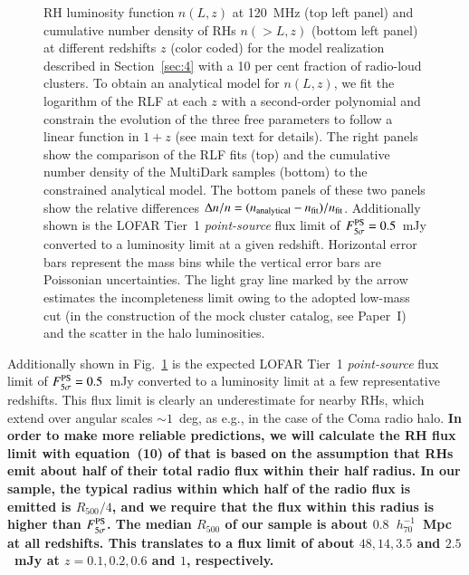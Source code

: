 \documentclass[useAMS,usenatbib]{mn2e}
\begin{document}
\begin{figure}
\caption{RH luminosity function $n(L,z)$ at 120~MHz (top left panel) and cumulative
  number density of RHs  $n(>L,z)$ (bottom left panel) at different redshifts $z$ (color
  coded) for the model realization described in Section~\ref{sec:4} with a 10 per cent
  fraction of radio-loud clusters. To obtain an analytical model for $n(L,z)$,
  we fit the logarithm of the RLF at each $z$ with a second-order polynomial and
  constrain the evolution of the three free parameters to follow a linear
  function in $1+z$ (see main text for details). The right panels show the
  comparison of the RLF fits (top) and the cumulative number density of the
  MultiDark samples (bottom) to the constrained analytical model. The bottom panels of these
  two panels show the relative differences $\Delta n / n =
  (n_{{\mathrm{analytical}}} - n_{{\mathrm{fit}}})/n_{{\mathrm{fit}}}$. Additionally shown is
  the LOFAR Tier~1 \emph{point-source} flux limit of
  $F_{5\sigma}^{{\mathrm{PS}}}=0.5$~mJy \citep{2012JApA..tmp...34R} converted to a
  luminosity limit at a given redshift. Horizontal error bars represent the mass
  bins while the vertical error bars are Poissonian uncertainties.  The light
  gray line marked by the arrow estimates the incompleteness limit owing to the
  adopted low-mass cut (in the construction of the mock cluster catalog, see Paper~I)
  and the scatter in the halo luminosities.}
\label{fig:RLF_120}
\end{figure} 

Additionally shown in Fig.~\ref{fig:RLF_120} is the expected LOFAR Tier~1
\emph{point-source} flux limit of $F_{5\sigma}^{{\mathrm{PS}}}=0.5$~mJy
\citep{2012JApA..tmp...34R} converted to a luminosity limit at a few
representative redshifts. This flux limit is clearly an underestimate for nearby
RHs, which extend over angular scales $\sim1$~deg, as e.g., in the case of the
Coma radio halo. {\bf In order to make more reliable predictions, we will
  calculate the RH flux limit with equation~(10) of \cite{2010A&A...509A..68C}
  that is based on the assumption that RHs emit about half of their total radio
  flux within their half radius. In our sample, the typical radius within which
  half of the radio flux is emitted is $R_{500}/4$, and we require that the flux
  within this radius is higher than $F_{5\sigma}^{{\mathrm{PS}}}$. The median
  $R_{500}$ of our sample is about $0.8$~$h_{70}^{-1}$~Mpc at all
  redshifts. This translates to a flux limit of about $48, 14, 3.5$ and
  $2.5$~mJy at $z = 0.1, 0.2, 0.6$ and $1$, respectively.}
\end{document}

